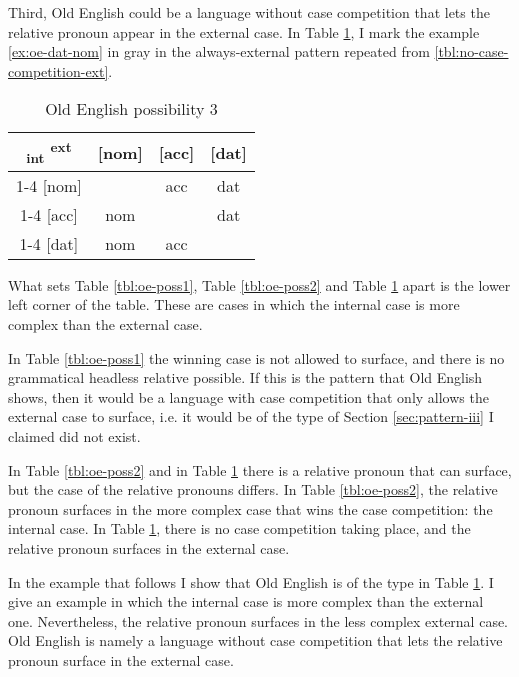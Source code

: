Third, Old English could be a language without case competition that lets the relative pronoun appear in the external case. In Table \ref{tbl:oe-poss3}, I mark the example \ref{ex:oe-dat-nom} in gray in the always-external pattern repeated from \ref{tbl:no-case-competition-ext}.

 \begin{table}[H]
   \center
   \caption{Old English possibility 3}
   \begin{tabular}{c|c|c|c}
     \toprule
    \textsubscript{\ac{int}} \textsuperscript{\ac{ext}}
           & [\ac{nom}]
           & [\ac{acc}]
           & [\ac{dat}]
           \\ \cmidrule{1-4}
       [\ac{nom}]
           & \xcancel{\phantom{xx}}
           & \ac{acc}
           & \cellcolor{LG}\ac{dat}
           \\ \cmidrule{1-4}
       [\ac{acc}]
           & \ac{nom}
           & \xcancel{\phantom{xx}}
           & \ac{dat}
           \\ \cmidrule{1-4}
       [\ac{dat}]
           & \ac{nom}
           & \ac{acc}
           & \xcancel{\phantom{xx}}
           \\
     \bottomrule
   \end{tabular}
   \label{tbl:oe-poss3}
 \end{table}

What sets Table \ref{tbl:oe-poss1}, Table \ref{tbl:oe-poss2} and Table \ref{tbl:oe-poss3} apart is the lower left corner of the table. These are cases in which the internal case is more complex than the external case.

In Table \ref{tbl:oe-poss1} the winning case is not allowed to surface, and there is no grammatical headless relative possible. If this is the pattern that Old English shows, then it would be a language with case competition that only allows the external case to surface, i.e. it would be of the type of Section \ref{sec:pattern-iii} I claimed did not exist.

In Table \ref{tbl:oe-poss2} and in Table \ref{tbl:oe-poss3} there is a relative pronoun that can surface, but the case of the relative pronouns differs. In Table \ref{tbl:oe-poss2}, the relative pronoun surfaces in the more complex case that wins the case competition: the internal case. In Table \ref{tbl:oe-poss3}, there is no case competition taking place, and the relative pronoun surfaces in the external case.

In the example that follows I show that Old English is of the type in Table \ref{tbl:oe-poss3}. I give an example in which the internal case is more complex than the external one. Nevertheless, the relative pronoun surfaces in the less complex external case. Old English is namely a language without case competition that lets the relative pronoun surface in the external case.

